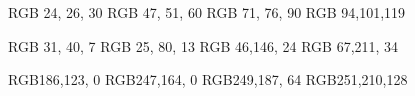 \definecolor{content_dark}   {RGB}{ 24, 26, 30}
\definecolor{content_normal} {RGB}{ 47, 51, 60}
\definecolor{content_light}  {RGB}{ 71, 76, 90}
\definecolor{content_bright} {RGB}{ 94,101,119}

\definecolor{accent_dark}    {RGB}{ 31, 40,  7}
\definecolor{accent_normal}  {RGB}{ 25, 80, 13}
\definecolor{accent_light}   {RGB}{ 46,146, 24}
\definecolor{accent_bright}  {RGB}{ 67,211, 34}

\definecolor{stress_dark}    {RGB}{186,123,  0}
\definecolor{stress_normal}  {RGB}{247,164,  0}
\definecolor{stress_light}   {RGB}{249,187, 64}
\definecolor{stress_bright}  {RGB}{251,210,128}
